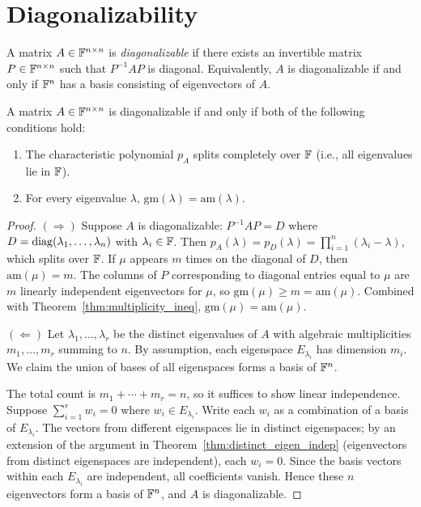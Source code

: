 \documentclass[11pt,a4paper]{article}
\begin{document}
\section{Diagonalizability}
\label{sec:diagonalizability}

\begin{definition}
\label{def:diagonalizable}
A matrix $A \in \mathbb{F}^{n \times n}$ is \emph{diagonalizable} if there exists
an invertible matrix $P \in \mathbb{F}^{n \times n}$ such that $P^{-1}AP$ is
diagonal.  Equivalently, $A$ is diagonalizable if and only if $\mathbb{F}^n$ has a
basis consisting of eigenvectors of $A$.
\end{definition}

\begin{keyresult}[title={Diagonalizability Criterion}]
\begin{theorem}
\label{thm:diag_criterion}
A matrix $A \in \mathbb{F}^{n \times n}$ is diagonalizable if and only if both
of the following conditions hold:
\begin{enumerate}[nosep]
  \item The characteristic polynomial $p_A$ splits completely over $\mathbb{F}$
        (i.e., all eigenvalues lie in $\mathbb{F}$).
  \item For every eigenvalue $\lambda$,
        $\mathrm{gm}(\lambda) = \mathrm{am}(\lambda)$.
\end{enumerate}
\end{theorem}
\end{keyresult}

\begin{proof}
$(\Rightarrow)$\; Suppose $A$ is diagonalizable: $P^{-1}AP = D$ where
$D = \operatorname{diag}(\lambda_1, \ldots, \lambda_n)$ with $\lambda_i \in \mathbb{F}$.  Then
$p_A(\lambda) = p_D(\lambda) = \prod_{i=1}^n (\lambda_i - \lambda)$,
which splits over $\mathbb{F}$.  If $\mu$ appears $m$ times on the diagonal of $D$,
then $\mathrm{am}(\mu) = m$.  The columns of $P$ corresponding to diagonal
entries equal to $\mu$ are $m$ linearly independent eigenvectors for $\mu$,
so $\mathrm{gm}(\mu) \geq m = \mathrm{am}(\mu)$.  Combined with
Theorem~\ref{thm:multiplicity_ineq}, $\mathrm{gm}(\mu) = \mathrm{am}(\mu)$.

$(\Leftarrow)$\; Let $\lambda_1, \ldots, \lambda_r$ be the distinct
eigenvalues of $A$ with algebraic multiplicities $m_1, \ldots, m_r$
summing to $n$.  By assumption, each eigenspace $E_{\lambda_i}$ has
dimension $m_i$.  We claim the union of bases of all eigenspaces forms a
basis of $\mathbb{F}^n$.

The total count is $m_1 + \cdots + m_r = n$, so it suffices to show
linear independence.  Suppose
$\sum_{i=1}^r w_i = 0$ where $w_i \in E_{\lambda_i}$.  Write each $w_i$
as a combination of a basis of $E_{\lambda_i}$.  The vectors from
different eigenspaces lie in distinct eigenspaces; by an extension of the
argument in Theorem~\ref{thm:distinct_eigen_indep} (eigenvectors from
distinct eigenspaces are independent), each $w_i = 0$.  Since the basis
vectors within each $E_{\lambda_i}$ are independent, all coefficients
vanish.  Hence these $n$ eigenvectors form a basis of $\mathbb{F}^n$, and $A$ is
diagonalizable.
\end{proof}
\end{document}
